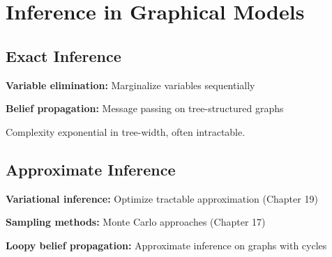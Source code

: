 
\section{Inference in Graphical Models }
\label{sec:inference}

\subsection{Exact Inference}

\textbf{Variable elimination:} Marginalize variables sequentially

\textbf{Belief propagation:} Message passing on tree-structured graphs

Complexity exponential in tree-width, often intractable.

\subsection{Approximate Inference}

\textbf{Variational inference:} Optimize tractable approximation (Chapter 19)

\textbf{Sampling methods:} Monte Carlo approaches (Chapter 17)

\textbf{Loopy belief propagation:} Approximate inference on graphs with cycles


